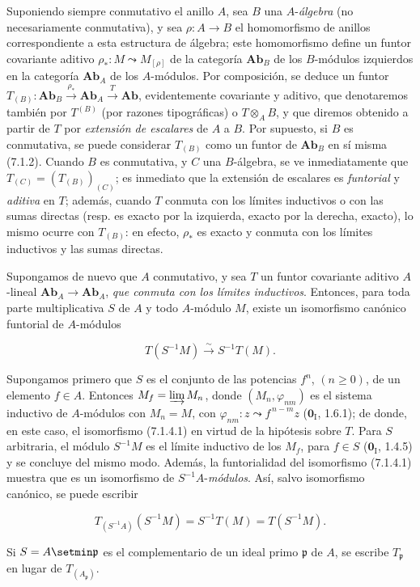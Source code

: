 \begin{env}[7.1.3]
Suponiendo siempre conmutativo el anillo $A$, sea $B$ una $A$-\emph{álgebra} (no
necesariamente conmutativa), y sea $\rho:A\to B$ el homomorfismo de anillos
correspondiente a esta estructura de álgebra; este homomorfismo define un
funtor covariante
aditivo $\rho_*:M\leadsto M_{[\rho]}$
de la categoría $\boldsymbol{Ab}_B$ de los $B$-módulos izquierdos en la categoría
$\boldsymbol{Ab}_A$ de los $A$-módulos. Por composición, se deduce un funtor $T_{(B)}:\boldsymbol{Ab}_B\xrightarrow{\rho_*}\boldsymbol{Ab}_A\xrightarrow{T}\boldsymbol{Ab}$,
evidentemente covariante y aditivo, que denotaremos también por $T^{(B)}$ (por
razones tipográficas) o $T\otimes_A B$, y que diremos obtenido a partir
de $T$ por \emph{extensión de escalares} de $A$ a $B$. Por supuesto, si $B$ es
conmutativa, se puede considerar $T_{(B)}$ como un funtor de
$\boldsymbol{Ab}_B$ en sí misma (7.1.2). Cuando $B$ es conmutativa, y $C$
una $B$-álgebra, se ve inmediatamente que $T_{(C)}=(T_{(B)})_{(C)}$;
es inmediato que la extensión de escalares es \emph{funtorial} y \emph{aditiva} en
$T$; además, cuando $T$ conmuta con los límites inductivos o con las sumas
directas (resp. es exacto por la izquierda, exacto por la derecha, exacto), lo mismo ocurre
con $T_{(B)}$: en efecto, $\rho_*$ es exacto y conmuta con los límites inductivos
y las sumas directas.
\end{env}

\begin{env}[7.1.4]
\label{III.7.1.4}
Supongamos de nuevo que $A$ conmutativo, y sea
$T$ un funtor covariante aditivo
$A$-lineal $\boldsymbol{Ab}_A\to\boldsymbol{Ab}_A$, \emph{que conmuta con los límites inductivos}. Entonces, para toda parte
multiplicativa $S$ de $A$ y
todo $A$-módulo $M$, existe un isomorfismo canónico funtorial de
$A$-módulos

\label{III.7.1.4.1}
\[
  T(S^{-1}M)\xrightarrow{\sim}S^{-1}T(M).
  \tag{7.1.4.1}\label{III.7.1.4.1.fr}
\]


Supongamos primero que $S$ es el conjunto de las potencias $f^n$,
$(n\geqslant0)$, de un elemento $f\in A$. Entonces
$M_f=\varinjlim M_n$,
donde $(M_n,\varphi_{nm})$ es el sistema inductivo de $A$-módulos
con $M_n=M$,
con $\varphi_{nm}:z\leadsto f^{\,n-m}z$ ($\mathbf{0}_{\mathrm I}$, 1.6.1);
de donde, en este caso, el isomorfismo (7.1.4.1) en virtud de la hipótesis sobre $T$. Para $S$ arbitraria, el módulo $S^{-1}M$ es
el límite inductivo de los $M_f$, para $f\in S$ ($\mathbf{0}_{\mathrm I}$, 1.4.5) y se concluye del mismo modo. Además,
la funtorialidad del isomorfismo (7.1.4.1) muestra que es un isomorfismo
de $S^{-1}A$-\emph{módulos}. Así, salvo
isomorfismo canónico, se puede escribir

\label{III.7.1.4.2}
\[
  T_{(S^{-1}A)}(S^{-1}M)
  =
  S^{-1}T(M)
  =
  T(S^{-1}M).
  \tag{7.1.4.2}\label{III.7.1.4.2.fr}
\]

Si $S=A\setmin\mathfrak p$ es el complementario de un ideal primo
$\mathfrak p$ de $A$, se escribe $T_{\mathfrak p}$ en lugar de
$T_{(A_{\mathfrak p})}$.
\end{env}

